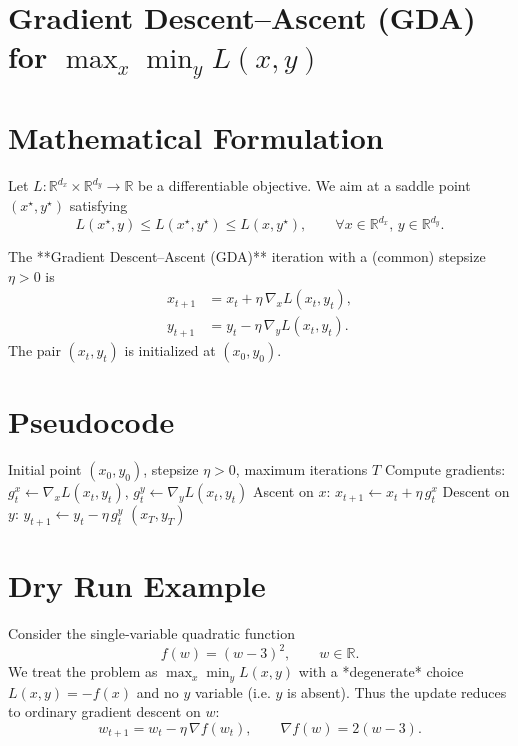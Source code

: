 \documentclass[11pt]{article}
\newcommand{\R}{\mathbb{R}}
\begin{document}
\section*{Gradient Descent–Ascent (GDA) for \(\displaystyle \max_{x}\min_{y} L(x,y)\)}

\section*{Mathematical Formulation}
Let \(L:\R^{d_{x}}\times\R^{d_{y}}\rightarrow\R\) be a differentiable objective.  
We aim at a saddle point \((x^{\star},y^{\star})\) satisfying
\[
L(x^{\star},y)\le L(x^{\star},y^{\star})\le L(x,y^{\star}),\qquad\forall x\in\R^{d_{x}},\,y\in\R^{d_{y}} .
\]

The **Gradient Descent–Ascent (GDA)** iteration with a (common) stepsize \(\eta>0\) is
\begin{align}
x_{t+1} &= x_{t} + \eta\,\nabla_{x}L(x_{t},y_{t}) ,\label{eq:update-x}\\
y_{t+1} &= y_{t} - \eta\,\nabla_{y}L(x_{t},y_{t}) .\label{eq:update-y}
\end{align}
The pair \((x_{t},y_{t})\) is initialized at \((x_{0},y_{0})\).

\section*{Pseudocode}
\begin{algorithm}[H]
\caption{Gradient Descent–Ascent (GDA)}
\begin{algorithmic}[1]
\Require Initial point \((x_{0},y_{0})\), stepsize \(\eta>0\), maximum iterations \(T\)
    \State Compute gradients:
    \(\displaystyle g^{x}_{t}\gets \nabla_{x}L(x_{t},y_{t})\),
    \(\displaystyle g^{y}_{t}\gets \nabla_{y}L(x_{t},y_{t})\)
    \State Ascent on \(x\):
    \(\displaystyle x_{t+1}\gets x_{t}+ \eta\, g^{x}_{t}\)
    \State Descent on \(y\):
    \(\displaystyle y_{t+1}\gets y_{t}- \eta\, g^{y}_{t}\)
\EndFor
\State \Return \((x_{T},y_{T})\)
\end{algorithmic}
\end{algorithm}

\section*{Dry Run Example}
Consider the single‑variable quadratic function
\[
f(w)= (w-3)^{2},\qquad w\in\R .
\]
We treat the problem as \(\max_{x}\min_{y} L(x,y)\) with a *degenerate* choice
\(L(x,y)= -f(x)\) and no \(y\) variable (i.e. \(y\) is absent).  
Thus the update reduces to ordinary gradient descent on \(w\):
\[
w_{t+1}=w_{t}-\eta\,\nabla f(w_{t}),\qquad \nabla f(w)=2(w-3).
\]
\end{document}
